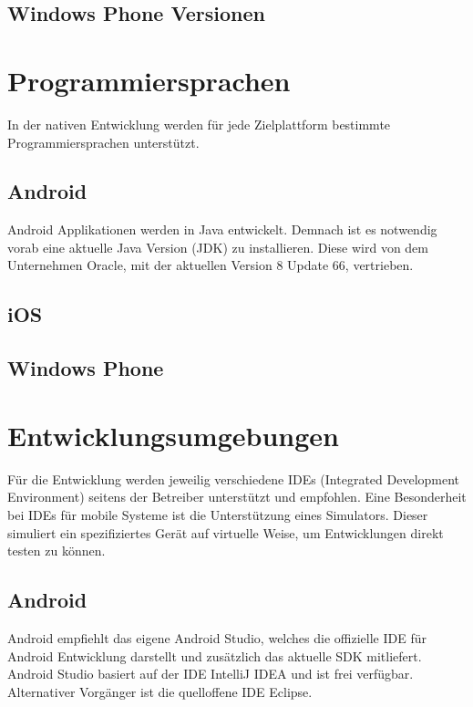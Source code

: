 \subsection{Windows Phone Versionen}

\section{Programmiersprachen}
In der nativen Entwicklung werden für jede Zielplattform bestimmte Programmiersprachen unterstützt. 

\subsection{Android}
Android Applikationen werden in Java entwickelt. Demnach ist es notwendig vorab eine aktuelle Java Version (JDK) zu installieren. Diese wird von dem Unternehmen Oracle, mit der aktuellen Version 8 Update 66, vertrieben.
\citep{java_jdk}

\subsection{iOS}

\subsection{Windows Phone}


\section{Entwicklungsumgebungen}
Für die Entwicklung werden jeweilig verschiedene IDEs (Integrated Development Environment) seitens der Betreiber unterstützt und empfohlen. Eine Besonderheit bei IDEs für mobile Systeme ist die Unterstützung eines Simulators. Dieser simuliert ein spezifiziertes Gerät auf virtuelle Weise, um Entwicklungen direkt testen zu können.

\subsection{Android}
Android empfiehlt das eigene Android Studio, welches die offizielle IDE für Android Entwicklung darstellt und zusätzlich das aktuelle SDK mitliefert. Android Studio basiert auf der IDE IntelliJ IDEA und ist frei verfügbar.\citep{android_studio} Alternativer Vorgänger ist die quelloffene IDE Eclipse.


